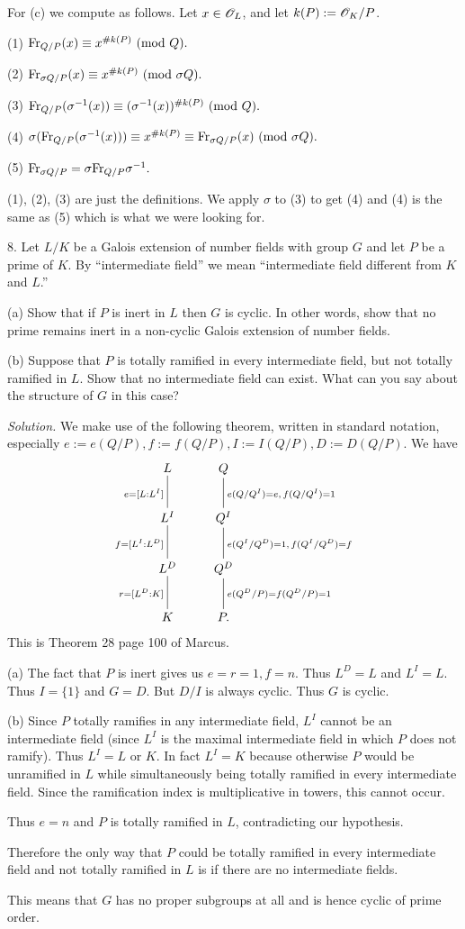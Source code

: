\documentclass[10pt,a4paper,reqno]{amsart}
\begin{document}
For (c) we compute as follows.  Let $x\in \mathscr{O}_L$, and let $k(P) := \mathscr{O}_K/P$.

(1) $\mathrm{Fr}_{Q/P}(x) \equiv x^{\# k(P)} \text{ } (\mathrm{mod}\text{ } Q).$

(2) $\mathrm{Fr}_{\sigma Q/P}(x) \equiv x^{\# k(P)} \text{ } (\mathrm{mod}\text{ } \sigma Q).$

(3) $\mathrm{Fr}_{Q/P}(\sigma^{-1}(x)) \equiv (\sigma^{-1}(x))^{\# k(P)}
\text{ } (\mathrm{mod}\text{ } Q). $

(4) $\sigma(\mathrm{Fr}_{Q/P}(\sigma^{-1}(x))) \equiv x^{\# k(P)} \equiv
\mathrm{Fr}_{\sigma Q/P}(x) \text{ } (\mathrm{mod}\text{ } \sigma Q).$

(5) $\mathrm{Fr}_{\sigma Q/P} = \sigma \mathrm{Fr}_{Q/P} \sigma^{-1}.$

(1), (2), (3) are just the definitions. We apply $\sigma$ to (3) to
get (4) and (4) is the same as (5) which is what we were looking for.

\bigskip

8. Let $L/K$ be a Galois extension of number fields with group $G$ and let $P$
be a prime of $K$. By ``intermediate field'' we mean ``intermediate field
different from $K$ and $L$.''

(a) Show that if $P$ is inert in $L$ then $G$ is cyclic. In other words, show
that no prime remains inert in a non-cyclic Galois extension of number fields.

(b) Suppose that $P$ is totally ramified in every intermediate field, but not
totally ramified in $L$. Show that no intermediate field can exist. What can
you say about the structure of $G$ in this case?

\bigskip

\textit{Solution.} We make use of the following theorem, written in standard
notation, especially $e := e(Q/P), f:= f(Q/P), I:= I(Q/P), D := D(Q/P)$. We
have
\[
\xymatrix{
L \ar@{-}[d]_{e = [L:L^I]} & Q \ar@{-}[d]^{e(Q/Q^I) = e,\, f(Q/Q^I)=1} \\
L^I \ar@{-}[d]_{f=[L^I:L^D]} & Q^I \ar@{-}[d]^{e(Q^I/Q^D)=1,\,f(Q^I/Q^D)=f} \\
L^D \ar@{-}[d]_{r=[L^D:K]} & Q^D \ar@{-}[d]^{e(Q^D/P)=f(Q^D/P)=1} \\
K & P.
}
\] This is Theorem 28 page 100 of Marcus.

(a) The fact that $P$ is inert gives us $e=r=1, f=n$. Thus $L^D = L$ and $L^I =
L$.  Thus $I = \{1\}$ and $G = D.$ But $D/I$ is always cyclic. Thus $G$ is
cyclic.

(b) Since $P$ totally ramifies in any intermediate field, $L^I$ cannot be an
intermediate field (since $L^I$ is the maximal intermediate field in which $P$
does not ramify). Thus $L^I = L$ or $K$. In fact $L^I = K$ because otherwise
$P$ would be unramified in $L$ while simultaneously being totally ramified in
every intermediate field.  Since the ramification index is multiplicative in
towers, this cannot occur.

Thus $e=n$ and $P$ is totally ramified in $L$, contradicting our hypothesis.

Therefore the only way that $P$ could be totally ramified in every intermediate
field and not totally ramified in $L$ is if there are no intermediate fields.

This means that $G$ has no proper subgroups at all and is hence cyclic of prime
order.
\end{document}

